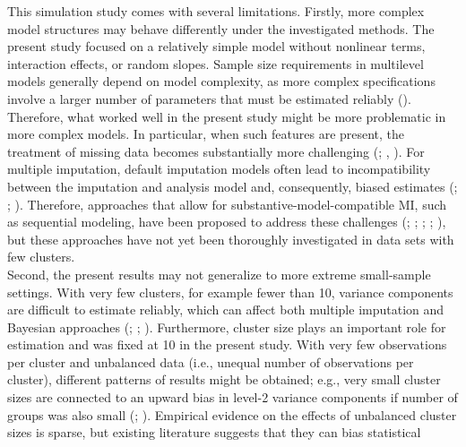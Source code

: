 \documentclass[
  letterpaper,
  11pt,
  english,
  singlespacing,
  headsepline,
  openany]{MastersDoctoralThesis}
\begin{document}
This simulation study comes with several limitations. Firstly, more
complex model structures may behave differently under the investigated
methods. The present study focused on a relatively simple model without
nonlinear terms, interaction effects, or random slopes. Sample size
requirements in multilevel models generally depend on model complexity,
as more complex specifications involve a larger number of parameters
that must be estimated reliably (). Therefore, what worked well in the present study might be more
problematic in more complex models. In particular, when such features
are present, the treatment of missing data becomes substantially more
challenging (;
,
). For multiple imputation, default
imputation models often lead to incompatibility between the imputation
and analysis model and, consequently, biased estimates
(; ; ). Therefore,
approaches that allow for substantive-model-compatible MI, such as
sequential modeling, have been proposed to address these challenges
(;
;
;
;
), but these approaches
have not yet been thoroughly investigated in data sets with few
clusters.\\
Second, the present results may not generalize to more extreme
small-sample settings. With very few clusters, for example fewer than
10, variance components are difficult to estimate reliably, which can
affect both multiple imputation and Bayesian approaches
(; ; ).
Furthermore, cluster size plays an important role for estimation and was
fixed at 10 in the present study. With very few observations per cluster
and unbalanced data (i.e., unequal number of observations per cluster),
different patterns of results might be obtained; e.g., very small
cluster sizes are connected to an upward bias in level-2 variance
components if number of groups was also small
(; ). Empirical evidence on the effects of unbalanced cluster sizes is
sparse, but existing literature suggests that they can bias statistical
\end{document}

